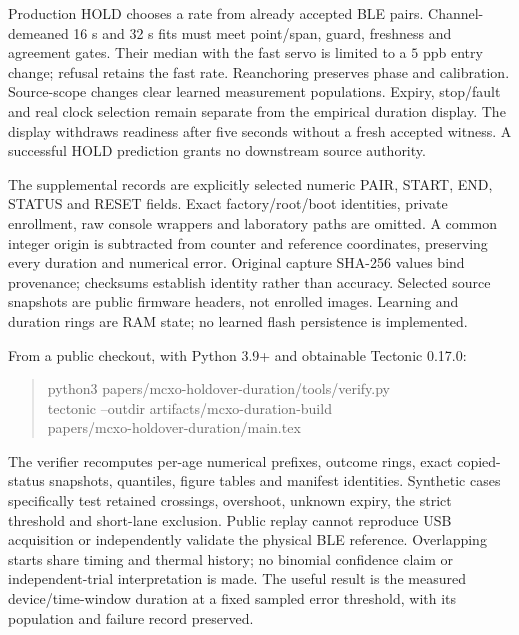 \documentclass[11pt,letterpaper]{article}
\begin{document}
Production HOLD chooses a rate from already accepted BLE pairs. Channel-demeaned 16 s and 32 s fits must meet point/span, guard, freshness and agreement gates. Their median with the fast servo is limited to a $5$ ppb entry change; refusal retains the fast rate. Reanchoring preserves phase and calibration. Source-scope changes clear learned measurement populations. Expiry, stop/fault and real clock selection remain separate from the empirical duration display. The display withdraws readiness after five seconds without a fresh accepted witness. A successful HOLD prediction grants no downstream source authority.

The supplemental records are explicitly selected numeric PAIR, START, END, STATUS and RESET fields. Exact factory/root/boot identities, private enrollment, raw console wrappers and laboratory paths are omitted. A common integer origin is subtracted from counter and reference coordinates, preserving every duration and numerical error. Original capture SHA-256 values bind provenance; checksums establish identity rather than accuracy. Selected source snapshots are public firmware headers, not enrolled images. Learning and duration rings are RAM state; no learned flash persistence is implemented.

From a public checkout, with Python 3.9+ and obtainable Tectonic 0.17.0:
\begin{quote}\small\ttfamily
python3 papers/mcxo-holdover-duration/tools/verify.py\\
tectonic --outdir artifacts/mcxo-duration-build\\
\hspace*{1em}papers/mcxo-holdover-duration/main.tex
\end{quote}
The verifier recomputes per-age numerical prefixes, outcome rings, exact copied-status snapshots, quantiles, figure tables and manifest identities. Synthetic cases specifically test retained crossings, overshoot, unknown expiry, the strict threshold and short-lane exclusion. Public replay cannot reproduce USB acquisition or independently validate the physical BLE reference. Overlapping starts share timing and thermal history; no binomial confidence claim or independent-trial interpretation is made. The useful result is the measured device/time-window duration at a fixed sampled error threshold, with its population and failure record preserved.
\end{document}
